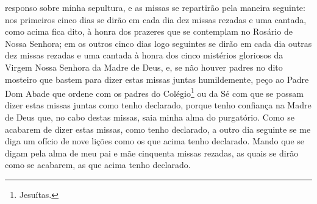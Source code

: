 responso sobre minha sepultura, e as missas se repartirão pela maneira
seguinte: nos primeiros cinco dias se dirão em cada dia dez missas
rezadas e uma cantada, como acima fica dito, à honra dos prazeres que
se contemplam no Rosário de Nossa Senhora; em os outros cinco dias logo
seguintes se dirão em cada dia outras dez missas rezadas e uma cantada
à honra dos cinco mistérios gloriosos da Virgem Nossa Senhora da Madre
de Deus, e, se não houver padres no dito mosteiro que bastem para dizer
estas missas juntas humildemente, peço ao Padre Dom Abade que ordene
com os padres do Colégio\footnote{ Jesuítas.} ou da Sé com que se
possam dizer estas missas juntas como tenho declarado, porque tenho
confiança na Madre de Deus que, no cabo destas missas, saia minha alma
do purgatório. Como se acabarem de dizer estas missas, como tenho
declarado, a outro dia seguinte se me diga um ofício de nove lições
como os que acima tenho declarado. Mando que se digam pela alma de meu
pai e mãe cinquenta missas rezadas, as quais se dirão como se acabarem,
as que acima tenho declarado. 

